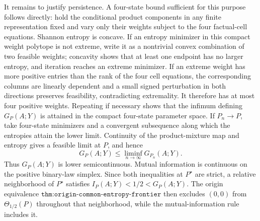 It remains to justify persistence.  A four-state bound sufficient for this purpose follows directly: hold the conditional product components in any finite representation fixed and vary only their weights subject to the four factual-cell equations.  Shannon entropy is concave.  If an entropy minimizer in this compact weight polytope is not extreme, write it as a nontrivial convex combination of two feasible weights; concavity shows that at least one endpoint has no larger entropy, and iteration reaches an extreme minimizer.  If an extreme weight has more positive entries than the rank of the four cell equations, the corresponding columns are linearly dependent and a small signed perturbation in both directions preserves feasibility, contradicting extremality.  It therefore has at most four positive weights.  Repeating if necessary shows that the infimum defining \(G_P(A;Y)\) is attained in the compact four-state parameter space.  If \(P_n\to P\), take four-state minimizers and a convergent subsequence along which the entropies attain the lower limit.  Continuity of the product-mixture map and entropy gives a feasible limit at \(P\), and hence
\[
 G_P(A;Y)\leq\liminf_{n\to\infty}G_{P_n}(A;Y).
\]
Thus \(G_P(A;Y)\) is lower semicontinuous.  Mutual information is continuous on the positive binary-law simplex.  Since both inequalities at \(P^\star\) are strict, a relative neighborhood of \(P^\star\) satisfies \(I_P(A;Y)<1/2<G_P(A;Y)\).  The origin equivalence \(\texttt{thm:origin-common-entropy-frontier}\) then excludes \((0,0)\) from \(\Theta_{1/2}(P)\) throughout that neighborhood, while the mutual-information rule includes it.